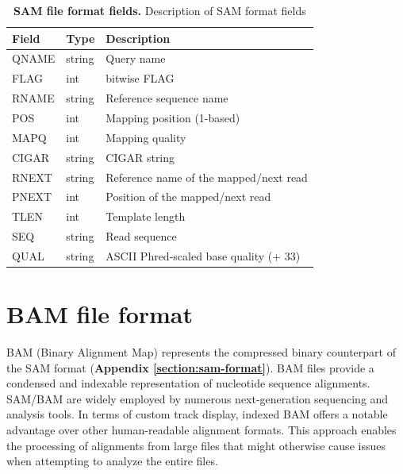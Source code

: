 \documentclass[a4paper, titlepage, openright]{book}
\begin{document}
\begin{table}[!]
    \centering
    \begin{tabular}{|l|l|l|}
        \hline
        \textbf{Field} & \textbf{Type} & \textbf{Description}                   \\ \hline
        QNAME          & string        & Query name                             \\ \hline
        FLAG           & int           & bitwise FLAG                           \\ \hline
        RNAME          & string        & Reference sequence name                \\ \hline
        POS            & int           & Mapping position (1-based)             \\ \hline
        MAPQ           & int           & Mapping quality                        \\ \hline
        CIGAR          & string        & CIGAR string                           \\ \hline
        RNEXT          & string        & Reference name of the mapped/next read \\ \hline
        PNEXT          & int           & Position of the mapped/next read       \\ \hline
        TLEN           & int           & Template length                        \\ \hline
        SEQ            & string        & Read sequence                          \\ \hline
        QUAL           & string        & ASCII Phred-scaled base quality (+ 33) \\ \hline
    \end{tabular}%
    \caption[SAM file format fields]{\textbf{SAM file format fields.} Description of SAM format fields}
    \label{tab:sam-file}
\end{table}

\section{BAM file format}\label{section:bam-format}
BAM (Binary Alignment Map) \citep{barnett2011bamtools} represents the compressed binary counterpart of the SAM format (\textbf{Appendix \ref{section:sam-format}}). BAM files provide a condensed and indexable representation of nucleotide sequence alignments. SAM/BAM are widely employed by numerous next-generation sequencing and analysis tools. In terms of custom track display, indexed BAM offers a notable advantage over other human-readable alignment formats. This approach enables the processing of alignments from large files that might otherwise cause issues when attempting to analyze the entire files.
\end{document}

